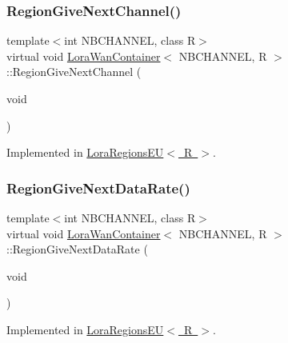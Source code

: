 \subsubsection{\texorpdfstring{Region\+Give\+Next\+Channel()}{RegionGiveNextChannel()}}
{\footnotesize\ttfamily template$<$int N\+B\+C\+H\+A\+N\+N\+EL, class R$>$ \\
virtual void \mbox{\hyperlink{class_lora_wan_container}{Lora\+Wan\+Container}}$<$ N\+B\+C\+H\+A\+N\+N\+EL, R $>$\+::Region\+Give\+Next\+Channel (\begin{DoxyParamCaption}\item[{void}]{ }\end{DoxyParamCaption})\hspace{0.3cm}{\ttfamily [pure virtual]}}



Implemented in \mbox{\hyperlink{class_lora_regions_e_u_adf5f39b2b13ad1dca0eccb80123c261d}{Lora\+Regions\+E\+U$<$ R $>$}}.

\mbox{\label{class_lora_wan_container_a32179d92bac6a7daea1bd39e84dec2a6}} 
\subsubsection{\texorpdfstring{Region\+Give\+Next\+Data\+Rate()}{RegionGiveNextDataRate()}}
{\footnotesize\ttfamily template$<$int N\+B\+C\+H\+A\+N\+N\+EL, class R$>$ \\
virtual void \mbox{\hyperlink{class_lora_wan_container}{Lora\+Wan\+Container}}$<$ N\+B\+C\+H\+A\+N\+N\+EL, R $>$\+::Region\+Give\+Next\+Data\+Rate (\begin{DoxyParamCaption}\item[{void}]{ }\end{DoxyParamCaption})\hspace{0.3cm}{\ttfamily [pure virtual]}}



Implemented in \mbox{\hyperlink{class_lora_regions_e_u_a10897e9e39c1b1682596b9e55844724c}{Lora\+Regions\+E\+U$<$ R $>$}}.

\mbox{\label{class_lora_wan_container_aeacbb5b9a6ca06708c095c2f67aae93e}} 
